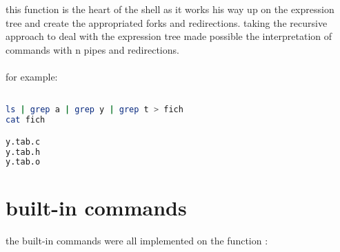 \documentclass[paper=a4, fontsize=11pt]{scrartcl}
\numberwithin{equation}{section}		%
\numberwithin{figure}{section}			%
\numberwithin{table}{section}				%
\begin{document}
this function is the heart of the shell as it works his way up on the expression tree and create the appropriated forks and redirections.
taking the recursive approach to deal with the expression tree made possible the interpretation of commands with n pipes and redirections.
\\
\\

for example:

\begin{lstlisting}[language=Bash]

ls | grep a | grep y | grep t > fich
cat fich 

y.tab.c
y.tab.h
y.tab.o

\end{lstlisting}


\section{built-in commands}
the built-in commands were all implemented on the function :
\end{document}
